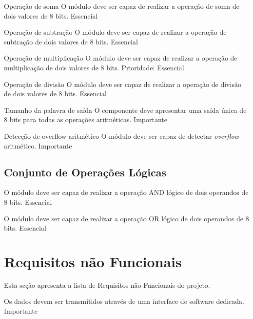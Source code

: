 \documentclass{article}
\begin{document}
    \begin{functional}
      \requirement
      {Operação de soma}
      {O módulo deve ser capaz de realizar a operação de soma de dois valores de 8 bits.}
      {Essencial}

      \requirement
      {Operação de subtração}
      {O módulo deve ser capaz de realizar a operação de subtração de dois valores de 8 bits.}
      {Essencial}

      \requirement
      {Operação de multiplicação}
      {O módulo deve ser capaz de realizar a operação de multiplicação de dois valores de 8 bits. }
      {Prioridade: Essencial}

      \requirement
      {Operação de divisão}
      {O módulo deve ser capaz de realizar a operação de divisão de dois valores de 8 bits.}
      {Essencial} 

      \requirement
      {Tamanho da palavra de saída}
      {O componente deve apresentar uma saída única de 8 bits para todas as operações aritméticas.}
      {Importante}       

      \requirement
      {Detecção de overflow aritmético}
      {O módulo deve ser capaz de detectar \textit{overflow} aritmético.}
      {Importante}
    \end{functional}

  \subsection{Conjunto de Operações Lógicas} 
  
    \begin{functional}
      {O módulo deve ser capaz de realizar a operação AND lógico de dois operandos de 8 bits.}
      {Essencial}

      {O módulo deve ser capaz de realizar a operação OR lógico de dois operandos de 8 bits.}
      {Essencial}      
     
    \end{functional}    

  \section{Requisitos não Funcionais}
  Esta seção apresenta a lista de Requisitos não Funcionais do projeto.

  \begin{nonfunctional}
    {Os dados devem ser transmitidos através de uma interface de software dedicada.}
    {Importante}

  \end{nonfunctional}
\end{document}
